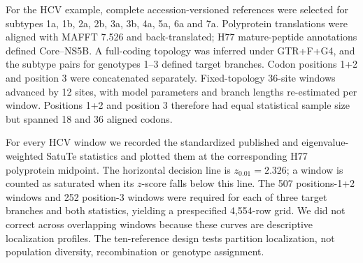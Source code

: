 For the HCV example, complete accession-versioned references were selected for subtypes 1a, 1b, 2a, 2b, 3a, 3b, 4a, 5a, 6a and 7a. Polyprotein translations were aligned with MAFFT 7.526 and back-translated; H77 mature-peptide annotations defined Core--NS5B. A full-coding topology was inferred under GTR+F+G4, and the subtype pairs for genotypes 1--3 defined target branches. Codon positions 1+2 and position 3 were concatenated separately. Fixed-topology 36-site windows advanced by 12 sites, with model parameters and branch lengths re-estimated per window. Positions 1+2 and position 3 therefore had equal statistical sample size but spanned 18 and 36 aligned codons.

For every HCV window we recorded the standardized published and eigenvalue-weighted SatuTe statistics and plotted them at the corresponding H77 polyprotein midpoint. The horizontal decision line is \(z_{0.01}=2.326\); a window is counted as saturated when its \(z\)-score falls below this line. The 507 positions-1+2 windows and 252 position-3 windows were required for each of three target branches and both statistics, yielding a prespecified 4,554-row grid. We did not correct across overlapping windows because these curves are descriptive localization profiles. The ten-reference design tests partition localization, not population diversity, recombination or genotype assignment.
